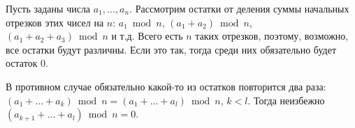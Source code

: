 \begin{itemize}
\itC Пусть заданы числа $a_1, \dots, a_n$. Рассмотрим остатки от деления суммы начальных 
отрезков этих чисел на $n$:
$a_1 \bmod n$, $(a_1+a_2) \bmod n$, $(a_1+a_2+a_3) \bmod n$ и т.д. 
Всего есть $n$ таких отрезков, поэтому, возможно, все остатки будут различны.
Если это так, тогда среди них обязательно будет остаток 0. 

В противном случае обязательно какой-то из остатков повторится два раза:
$(a_1 + \dots + a_k) \bmod n = (a_1 + \dots + a_l) \bmod n$, $k < l$. Тогда
неизбежно $(a_{k+1} + \dots + a_l) \bmod n = 0$.

\end{itemize}